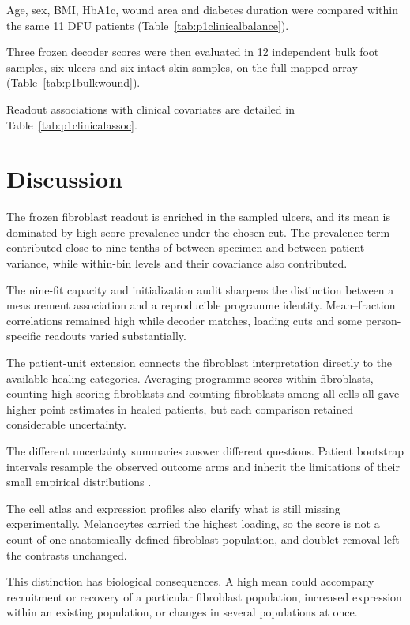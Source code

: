 \documentclass[10pt,a4paper]{article}
\begin{document}
Age, sex, BMI, HbA1c, wound area and diabetes duration were compared within the same 11 DFU patients (Table~\ref{tab:p1clinicalbalance}).

Three frozen decoder scores were then evaluated in 12 independent bulk foot samples, six ulcers and six intact-skin samples, on the full mapped array (Table~\ref{tab:p1bulkwound}).

Readout associations with clinical covariates are detailed in Table~\ref{tab:p1clinicalassoc}.

\section{Discussion}

The frozen fibroblast readout is enriched in the sampled ulcers, and its mean is dominated by high-score prevalence under the chosen cut. The prevalence term contributed close to nine-tenths of between-specimen and between-patient variance, while within-bin levels and their covariance also contributed.

The nine-fit capacity and initialization audit sharpens the distinction between a measurement association and a reproducible programme identity. Mean--fraction correlations remained high while decoder matches, loading cuts and some person-specific readouts varied substantially.

The patient-unit extension connects the fibroblast interpretation directly to the available healing categories. Averaging programme scores within fibroblasts, counting high-scoring fibroblasts and counting fibroblasts among all cells all gave higher point estimates in healed patients, but each comparison retained considerable uncertainty.

The different uncertainty summaries answer different questions. Patient bootstrap intervals resample the observed outcome arms and inherit the limitations of their small empirical distributions \citep{efron1993}.

The cell atlas and expression profiles also clarify what is still missing experimentally. Melanocytes carried the highest loading, so the score is not a count of one anatomically defined fibroblast population, and doublet removal left the contrasts unchanged.

This distinction has biological consequences. A high mean could accompany recruitment or recovery of a particular fibroblast population, increased expression within an existing population, or changes in several populations at once.
\end{document}
